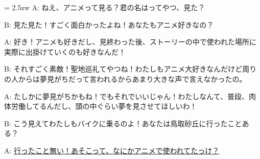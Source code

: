 \documentclass[11pt]{amsart}
\title{}
\author{}
\newenvironment{hangall}[1]{\hangindent = 2.5zw\everypar{\hangindent = 2.5zw}}{}
\begin{document}
\maketitle
\begin{hangall}{}%
A: ねえ、アニメって見る？君の名はってやつ、見た？

B: 見た見た！すごく面白かったよね！あなたもアニメ好きなの？

A: 好き！アニメも好きだし、見終わった後、ストーリーの中で使われた場所に実際に出掛けていくのも好きなんだ！

B: それすごく素敵！聖地巡礼てやつね！わたしもアニメ大好きなんだけど周りの人からは夢見がちだって言われるからあまり大きな声で言えなかったの。

A: たしかに夢見がちかもね！でもそれでいいじゃん！わたしなんて、普段、肉体労働してるんだし、頭の中ぐらい夢を見させてほしいわ！

B: こう見えてわたしもバイクに乗るのよ！あなたは鳥取砂丘に行ったことある？

A: \ul{行ったこと無い！あそこって、なにかアニメで使われてたっけ？}\end{hangall}
\end{document}
